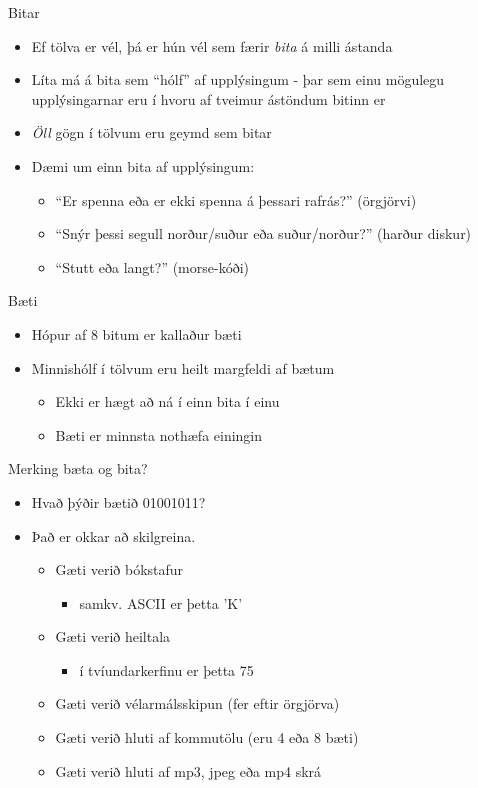 \documentclass{beamer}
\begin{document}
\begin{frame}{Bitar}
\begin{itemize} 
 \item Ef tölva er vél, þá er hún vél sem færir \emph{bita} á milli ástanda
 \item Líta má á bita sem ``hólf'' af upplýsingum - þar sem einu mögulegu upplýsingarnar eru í hvoru af tveimur ástöndum bitinn er
 \item \emph{Öll} gögn í tölvum eru geymd sem bitar
 \item Dæmi um einn bita af upplýsingum:
 \begin{itemize}
  \item ``Er spenna eða er ekki spenna á þessari rafrás?'' (örgjörvi)
  \item ``Snýr þessi segull norður/suður eða suður/norður?'' (harður diskur)
  \item ``Stutt eða langt?'' (morse-kóði)
 \end{itemize}
\end{itemize}
\end{frame}

\begin{frame}{Bæti}
\begin{itemize}
 \item Hópur af 8 bitum er kallaður bæti
 \item Minnishólf í tölvum eru heilt margfeldi af bætum
 \begin{itemize}
  \item Ekki er hægt að ná í einn bita í einu
  \item Bæti er minnsta nothæfa einingin
 \end{itemize}
\end{itemize}
\end{frame}

\begin{frame}{Merking bæta og bita?}

\begin{itemize}
 \item Hvað þýðir bætið 01001011? \pause
 \item Það er okkar að skilgreina.
 \begin{itemize}
  \item Gæti verið bókstafur
  \begin{itemize}
   \item samkv. ASCII er þetta 'K'
  \end{itemize}
   \item Gæti verið heiltala
  \begin{itemize}
   \item í tvíundarkerfinu er þetta 75
  \end{itemize}
  \item Gæti verið vélarmálsskipun (fer eftir örgjörva)
  \item Gæti verið hluti af kommutölu (eru 4 eða 8 bæti)
  \item Gæti verið hluti af mp3, jpeg eða mp4 skrá
 \end{itemize}
\end{itemize}
\end{frame}
\end{document}
